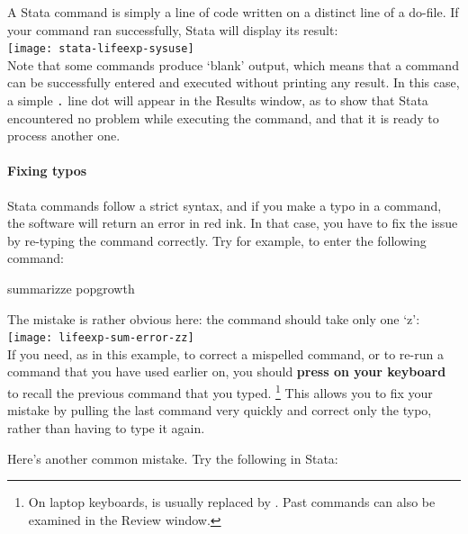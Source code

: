   A Stata command is simply a line of code written on a distinct line of a do-file. If your command ran successfully, Stata will display its result:\\[1em]
    
    \texttt{[image: stata-lifeexp-sysuse]}\\[1em]

  Note that some commands produce `blank' output, which means that a command can be successfully entered and executed without printing any result. In this case, a simple \texttt{.} line dot will appear in the Results window, as to show that Stata encountered no problem while executing the command, and that it is ready to process another one.%

  \paragraph{Fixing typos}%

  Stata commands follow a strict syntax, and if you make a typo in a command, the software will return an error in red ink. In that case, you have to fix the issue by re-typing the command correctly. Try for example, to enter the following command:%
    
    \begin{docspec}
      summarizze popgrowth
    \end{docspec}%
    
    The mistake is rather obvious here: the  command should take only one `z':\\[1em]%
    
    \texttt{[image: lifeexp-sum-error-zz]}\\[1em]
    
    If you need, as in this example, to correct a mispelled command, or to re-run a command that you have used earlier on, you should \textbf{press  on your keyboard} to recall the previous command that you typed.%
    \footnote{On laptop keyboards,  is usually replaced by . Past commands can also be examined in the Review window.} %
    This allows you to fix your mistake by pulling the last command very quickly and correct only the typo, rather than having to type it again.%

    Here's another common mistake. Try the following in Stata:%
    
